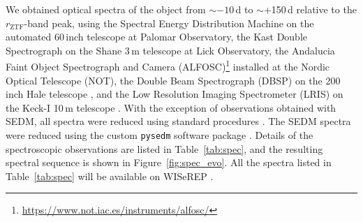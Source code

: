 \documentclass[twocolumn]{aastex631}
\begin{document}
We obtained optical spectra of the object from $\sim$$-10$\,d to $\sim$+150\,d relative to the $r_\mathrm{ZTF}$-band peak, using the Spectral Energy Distribution Machine \citep[SEDM;][]{SEDM_2018} on the automated 60\,inch telescope \citep[P60;][]{P60_2006} at Palomar Observatory, the Kast Double Spectrograph \citep{miller1994kast} on the Shane 3\,m telescope at Lick Observatory, the Andalucia Faint Object Spectrograph and Camera (ALFOSC)\footnote{\url{https://www.not.iac.es/instruments/alfosc/}} installed at the Nordic Optical Telescope (NOT), the Double Beam Spectrograph (DBSP) on the 200\,inch Hale telescope \citep[P200;][]{P200_1982}, and the Low Resolution Imaging Spectrometer (LRIS) on the Keck-I 10\,m telescope \citep{Keck_1995}. With the exception of observations obtained with SEDM, all spectra were reduced using standard procedures \citep[e.g.,][]{Matheson_2000}. The SEDM spectra were reduced using the custom \texttt{pysedm} software package \citep{Rigault_pysedm_2019}. Details of the spectroscopic observations are listed in Table~\ref{tab:spec}, and the resulting spectral sequence is shown in Figure~\ref{fig:spec_evo}. All the spectra listed in Table~\ref{tab:spec} will be available on WISeREP \citep{wiserep_2012}.
\end{document}

